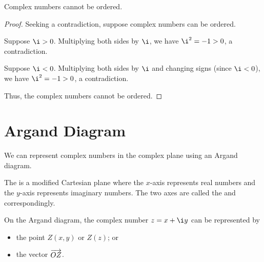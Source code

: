 \begin{proposition}
    Complex numbers cannot be ordered.
\end{proposition}
\begin{proof}
    Seeking a contradiction, suppose complex numbers can be ordered.
    
     Suppose $\i > 0$. Multiplying both sides by $\i$, we have $\i^2 = -1 > 0$, a contradiction.

     Suppose $\i < 0$. Multiplying both sides by $\i$ and changing signs (since $\i < 0$), we have $\i^2 = -1 > 0$, a contradiction.
    
    Thus, the complex numbers cannot be ordered.
\end{proof}

\section{Argand Diagram}

We can represent complex numbers in the complex plane using an Argand diagram.

\begin{definition}
    The  is a modified Cartesian plane where the $x$-axis represents real numbers and the $y$-axis represents imaginary numbers. The two axes are called the  and  correspondingly.
\end{definition}

On the Argand diagram, the complex number $z = x + \i y$ can be represented by
\begin{itemize}
    \item the point $Z(x, y)$ or $Z(z)$; or
    \item the vector $\overrightarrow{OZ}$.
\end{itemize}

\begin{figure}[H]
    \centering
    \caption{}
\end{figure}

